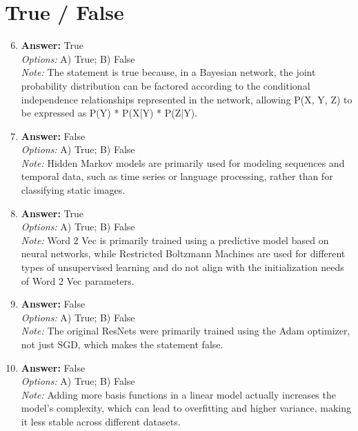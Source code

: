 \documentclass[12pt]{article}
\begin{document}
\section*{True / False}
\begin{enumerate}[label=\arabic*.]
\setcounter{enumi}{5}
\item \textbf{Answer:} True
\\ \textit{Options:} A) True; B) False
\\ \textit{Note:} The statement is true because, in a Bayesian network, the joint probability distribution can be factored according to the conditional independence relationships represented in the network, allowing P(X, Y, Z) to be expressed as P(Y) * P(X|Y) * P(Z|Y).
\item \textbf{Answer:} False
\\ \textit{Options:} A) True; B) False
\\ \textit{Note:} Hidden Markov models are primarily used for modeling sequences and temporal data, such as time series or language processing, rather than for classifying static images.
\item \textbf{Answer:} True
\\ \textit{Options:} A) True; B) False
\\ \textit{Note:} Word 2 Vec is primarily trained using a predictive model based on neural networks, while Restricted Boltzmann Machines are used for different types of unsupervised learning and do not align with the initialization needs of Word 2 Vec parameters.
\item \textbf{Answer:} False
\\ \textit{Options:} A) True; B) False
\\ \textit{Note:} The original ResNets were primarily trained using the Adam optimizer, not just SGD, which makes the statement false.
\item \textbf{Answer:} False
\\ \textit{Options:} A) True; B) False
\\ \textit{Note:} Adding more basis functions in a linear model actually increases the model's complexity, which can lead to overfitting and higher variance, making it less stable across different datasets.
\end{enumerate}
\end{document}
